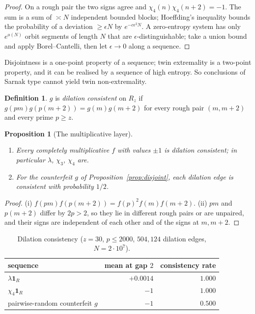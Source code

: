 \documentclass[11pt]{amsart}
\newtheorem{proposition}[theorem]{Proposition}
\theoremstyle{definition}
\newtheorem{definition}[theorem]{Definition}
\theoremstyle{remark}
\newcommand{\one}{\mathbf 1}
\begin{document}
\begin{proof}
On a rough pair the two signs agree and $\chi_4(n)\chi_4(n+2)=-1$. The sum is a sum of $\asymp N$ independent bounded blocks; Hoeffding's inequality bounds the probability of a deviation $\ge\epsilon N$ by $e^{-c\epsilon^2N}$. A zero-entropy system has only $e^{o(N)}$ orbit segments of length $N$ that are $\epsilon$-distinguishable; take a union bound and apply Borel--Cantelli, then let $\epsilon\to0$ along a sequence.
\end{proof}

Disjointness is a one-point property of a sequence; twin extremality is a two-point property, and it can be realised by a sequence of high entropy. So conclusions of Sarnak type \cite{Sar11} cannot yield twin non-extremality.

\begin{definition}
$g$ is \emph{dilation consistent} on $R_z$ if $g(pm)g(p(m+2))=g(m)g(m+2)$ for every rough pair $(m,m+2)$ and every prime $p\ge z$.
\end{definition}

\begin{proposition}[The multiplicative layer]\label{prop:dilation}
\begin{enumerate}
\item[(i)] Every completely multiplicative $f$ with values $\pm1$ is dilation consistent; in particular $\lambda$, $\chi_3$, $\chi_4$ are.
\item[(ii)] For the counterfeit $g$ of Proposition~\ref{prop:disjoint}, each dilation edge is consistent with probability $1/2$.
\end{enumerate}
\end{proposition}

\begin{proof}
(i) $f(pm)f(p(m+2))=f(p)^2f(m)f(m+2)$. (ii) $pm$ and $p(m+2)$ differ by $2p>2$, so they lie in different rough pairs or are unpaired, and their signs are independent of each other and of the signs at $m,m+2$.
\end{proof}

\begin{table}[h]
\centering\small
\caption{Dilation consistency ($z=30$, $p\le2000$, $504{,}124$ dilation edges, $N=2\cdot10^7$).}\label{tab:dilation}
\begin{tabular}{lrr}
\toprule
sequence & mean at gap $2$ & consistency rate\\
\midrule
$\lambda\one_R$ & $+0.0014$ & $1.000$\\
$\chi_4\one_R$ & $-1$ & $1.000$\\
pairwise-random counterfeit $g$ & $-1$ & $0.500$\\
\bottomrule
\end{tabular}
\end{table}
\end{document}
